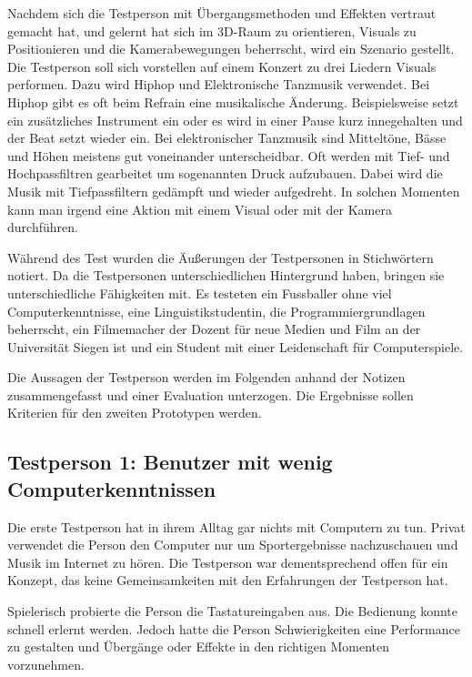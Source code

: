 Nachdem sich die Testperson mit \"Ubergangsmethoden und Effekten vertraut gemacht hat, und gelernt hat sich im 3D-Raum zu
orientieren, Visuals zu Positionieren und die Kamerabewegungen beherrscht, wird ein Szenario gestellt. Die Testperson soll
sich vorstellen auf einem Konzert zu drei Liedern Visuals performen. Dazu wird Hiphop und Elektronische Tanzmusik
verwendet. Bei Hiphop gibt es oft beim Refrain eine musikalische \"Anderung. Beispielsweise setzt ein zus\"atzliches
Instrument ein oder es wird in einer Pause kurz innegehalten und der Beat setzt wieder ein. Bei elektronischer
Tanzmusik sind Mittelt\"one, B\"asse und H\"ohen meistens gut voneinander unterscheidbar. Oft werden mit Tief- und
Hochpassfiltren gearbeitet um sogenannten Druck aufzubauen. Dabei wird die Musik mit Tiefpassfiltern ged\"ampft und wieder
aufgedreht. In solchen Momenten kann man irgend eine Aktion mit einem Visual oder mit der Kamera durchf\"uhren.

W\"ahrend des Test wurden die \"Au\ss{}erungen der Testpersonen in Stichw\"ortern notiert. Da die Testpersonen
unterschiedlichen Hintergrund haben, bringen sie unterschiedliche F\"ahigkeiten mit. Es testeten ein Fussballer ohne viel
Computerkenntnisse, eine Linguistikstudentin, die Programmiergrundlagen beherrscht,
ein Filmemacher der Dozent f\"ur neue Medien und Film an der Universit\"at Siegen ist und ein Student
mit einer Leidenschaft f\"ur Computerspiele.

Die Aussagen der Testperson werden im Folgenden anhand der Notizen zusammengefasst und einer Evaluation unterzogen.
Die Ergebnisse sollen Kriterien f\"ur den zweiten Prototypen werden.

\subsection{Testperson 1: Benutzer mit wenig Computerkenntnissen}

Die erste Testperson hat in ihrem Alltag gar nichts mit Computern zu tun. Privat verwendet die Person den Computer nur um
Sportergebnisse nachzuschauen und Musik im Internet zu h\"oren. Die Testperson war dementsprechend offen f\"ur ein Konzept,
das keine Gemeinsamkeiten mit den Erfahrungen der Testperson hat.

Spielerisch probierte die Person die Tastatureingaben aus.
Die Bedienung konnte schnell erlernt werden. Jedoch hatte die Person Schwierigkeiten eine Performance zu gestalten und
\"Uberg\"ange oder Effekte in den richtigen Momenten vorzunehmen.

